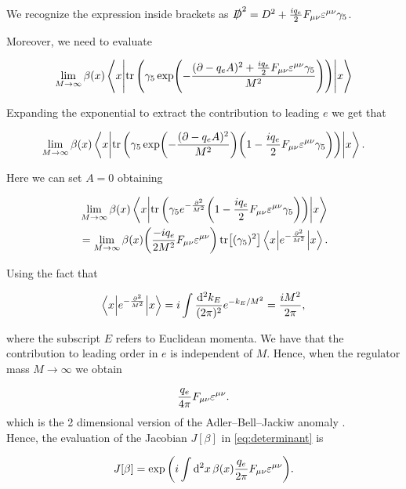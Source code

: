 We recognize the expression inside brackets as $\slashed{D}^2 = D^2 + \frac{iq_e}{2} F_{\mu\nu}\varepsilon^{\mu\nu}\gamma_5$. 

Moreover, we need to evaluate

\begin{align}
    \lim_{M\to\infty}\beta(x)\ev**{\tr\qty(\gf \exp(-\frac{(\partial-q_eA)^2 + \frac{iq_e}{2} F_{\mu\nu}\eumn\gf }{M^2}))}{x}
\end{align}

Expanding the exponential to extract the contribution to leading $e$ we get that

\begin{equation}
    \lim_{M\to\infty}\beta(x)\ev**{\tr\qty(\gf \exp(-\frac{(\partial-q_eA)^2}{M^2})\qty(1 - \frac{iq_e}{2} F_{\mu\nu}\eumn\gf))}{x}.
\end{equation}

Here we can set $A=0$ obtaining

\begin{align}
        &\lim_{M\to\infty}\beta(x)\ev**{\tr\qty(\gf e^{-\frac{\partial^2}{M^2}}\qty(1 - \frac{iq_e}{2} F_{\mu\nu}\eumn\gf))}{x} \nonumber\\ &=\lim_{M\to\infty}\beta(x)\qty(\frac{-iq_e}{2M^2}F_{\mu\nu}\eumn)\tr[(\gf)^2] \ev**{e^{-\frac{\partial^2}{M^2}}}{x}.
\end{align}

Using the fact that

\begin{equation}
\ev**{e^{-\frac{\partial^2}{M^2}}}{x} = i\int \frac{\dd[2]{k_E}}{(2\pi)^2}e^{-k_E/M^2}=\frac{i M^2}{2\pi},
\end{equation}

where the subscript $E$ refers to Euclidean momenta. We have that the contribution to leading order in $e$ is independent of $M$. Hence, when the regulator mass $M\to\infty$ we obtain

\begin{equation}
\frac{q_e}{4\pi}F_{\mu\nu}\varepsilon^{\mu\nu}.
\end{equation}
which is the 2 dimensional version of the Adler–Bell–Jackiw anomaly \cite{Bell1969,Adler}.\\

Hence, the evaluation of the Jacobian $J[\beta]$ in \eqref{eq:determinant} is

\begin{equation}
J[\beta] = \exp\qty(i \int\dd[2]{x}\beta(x)\frac{q_e}{2\pi}F_{\mu\nu}\varepsilon^{\mu\nu}).
\end{equation}

